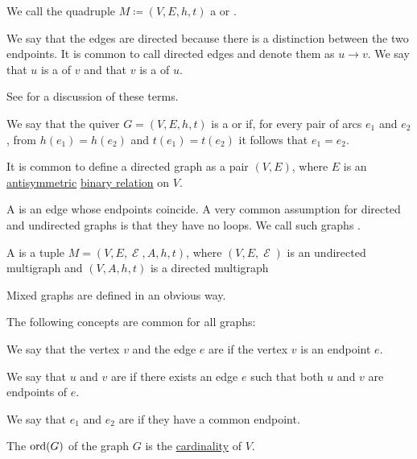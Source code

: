 \begin{definition}
\begin{thmenum}[series=def:graph]
    We call the quadruple \( M \coloneqq (V, E, h, t) \) a  or .

    We say that the edges are directed because there is a distinction between the two endpoints. It is common to call directed edges  and denote them as \( u \to v \). We say that \( u \) is a  of \( v \) and that \( v \) is a  of \( u \).

    See  for a discussion of these terms.

     We say that the quiver \( G = (V, E, h, t) \) is a  or  if, for every pair of arcs \( e_1 \) and \( e_2 \), from \( h(e_1) = h(e_2) \) and \( t(e_1) = t(e_2) \) it follows that \( e_1 = e_2 \).

    It is common to define a directed graph as a pair \( (V, E) \), where \( E \) is an \hyperref[def:binary_relation/antisymmetric]{antisymmetric} \hyperref[def:binary_relation]{binary relation} on \( V \).

     A  is an edge whose endpoints coincide. A very common assumption for directed and undirected graphs is that they have no loops. We call such graphs .

     A  is a tuple \( M = (V, E, \mscrE, A, h, t) \), where \( (V, E, \mscrE) \) is an undirected multigraph and \( (V, A, h, t) \) is a directed multigraph

    Mixed graphs are defined in an obvious way.
  \end{thmenum}

  The following concepts are common for all graphs:
  \begin{thmenum}[resume=def:graph]
     We say that the vertex \( v \) and the edge \( e \) are  if the vertex \( v \) is an endpoint \( e \).

     We say that \( u \) and \( v \) are  if there exists an edge \( e \) such that both \( u \) and \( v \) are endpoints of \( e \).

     We say that \( e_1 \) and \( e_2 \) are  if they have a common endpoint.

     The  \( \operatorname{ord}(G) \) of the graph \( G \) is the \hyperref[thm:cardinality_existence]{cardinality} of \( V \).


\end{thmenum}
\end{definition}
